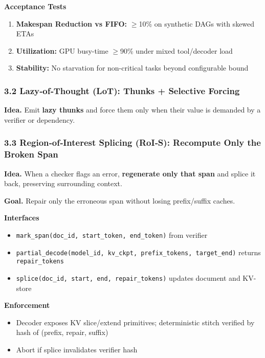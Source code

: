 \documentclass[
]{article}
\begin{document}
\textbf{Acceptance Tests}
\begin{enumerate}
\item \textbf{Makespan Reduction vs FIFO:} \ensuremath{\geq}10\% on
  synthetic DAGs with skewed ETAs
\item \textbf{Utilization:} GPU busy-time \ensuremath{\geq}90\% under
  mixed tool/decoder load
\item \textbf{Stability:} No starvation for non-critical tasks beyond
  configurable bound
\end{enumerate}

\hypertarget{lazyofthought-lot-thunks-selective-forcing}{%
\subsubsection{3.2 Lazy‑of‑Thought (LoT): Thunks + Selective
Forcing}\label{lazyofthought-lot-thunks-selective-forcing}}

\textbf{Idea.} Emit \textbf{lazy thunks} and force them only when their
value is demanded by a verifier or dependency.

\hypertarget{regionofinterest-splicing-rois-recompute-only-the-broken-span}{%
\subsubsection{3.3 Region‑of‑Interest Splicing (RoI‑S): Recompute Only
the Broken
Span}\label{regionofinterest-splicing-rois-recompute-only-the-broken-span}}

\textbf{Idea.} When a checker flags an error, \textbf{regenerate only
that span} and splice it back, preserving surrounding context.

\textbf{Goal.} Repair only the erroneous span without losing
prefix/suffix caches.

\textbf{Interfaces}
\begin{itemize}
\item \texttt{mark\_span(doc\_id, start\_token, end\_token)} from
  verifier
\item \texttt{partial\_decode(model\_id, kv\_ckpt, prefix\_tokens, target\_end)}
  returns \texttt{repair\_tokens}
\item \texttt{splice(doc\_id, start, end, repair\_tokens)} updates
  document and KV-store
\end{itemize}

\textbf{Enforcement}
\begin{itemize}
\item Decoder exposes KV slice/extend primitives; deterministic stitch
  verified by hash of (prefix, repair, suffix)
\item Abort if splice invalidates verifier hash
\end{itemize}
\end{document}
